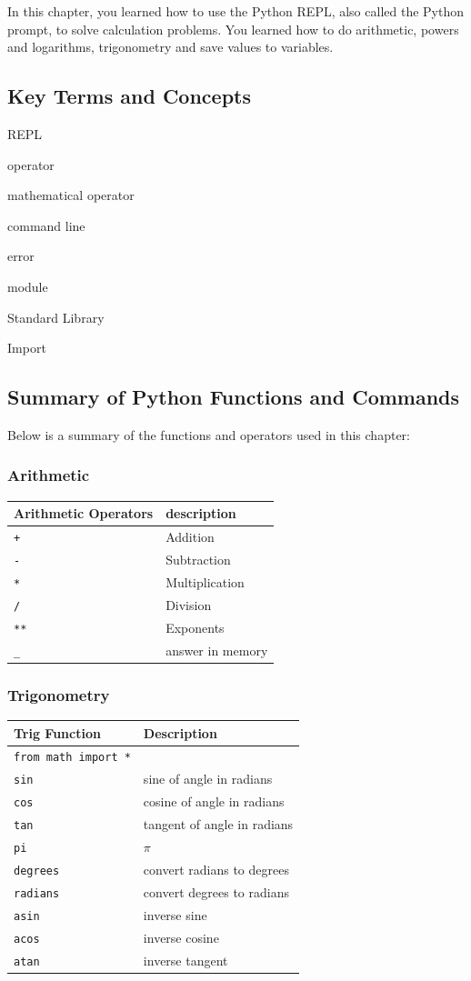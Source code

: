 \documentclass{book}
\begin{document}
    
        In this chapter, you learned how to use the Python REPL, also called the
Python prompt, to solve calculation problems. You learned how to do
arithmetic, powers and logarithms, trigonometry and save values to
variables.
    




    
        \subsection{Key Terms and Concepts}\label{key-terms-and-concepts}

REPL

operator

mathematical operator

command line

error

module

Standard Library

Import
    




    
        \subsection{Summary of Python Functions and
Commands}\label{summary-of-python-functions-and-commands}

Below is a summary of the functions and operators used in this chapter:

\subsubsection{Arithmetic}\label{arithmetic}

\begin{longtable}[]{@{}ll@{}}
\toprule
Arithmetic Operators & description\tabularnewline
\midrule
\endhead
\lstinline!+! & Addition\tabularnewline
\lstinline!-! & Subtraction\tabularnewline
\lstinline!*! & Multiplication\tabularnewline
\lstinline!/! & Division\tabularnewline
\lstinline!**! & Exponents\tabularnewline
\lstinline!_! & answer in memory\tabularnewline
\bottomrule
\end{longtable}

\subsubsection{Trigonometry}\label{trigonometry}

\begin{longtable}[]{@{}ll@{}}
\toprule
Trig Function & Description\tabularnewline
\midrule
\endhead
\lstinline!from math import *! &\tabularnewline
\lstinline!sin! & sine of angle in radians\tabularnewline
\lstinline!cos! & cosine of angle in radians\tabularnewline
\lstinline!tan! & tangent of angle in radians\tabularnewline
\lstinline!pi! & \(\pi\)\tabularnewline
\lstinline!degrees! & convert radians to degrees\tabularnewline
\lstinline!radians! & convert degrees to radians\tabularnewline
\lstinline!asin! & inverse sine\tabularnewline
\lstinline!acos! & inverse cosine\tabularnewline
\lstinline!atan! & inverse tangent\tabularnewline
\bottomrule
\end{longtable}
\end{document}
